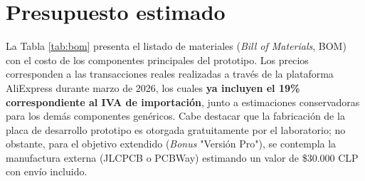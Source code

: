 \documentclass[letterpaper,11pt]{article}
\newcommand{\rtabla}[1]{Tabla \ref{#1}}
\begin{document}
\section{Presupuesto estimado}

La \rtabla{tab:bom} presenta el listado de materiales (\textit{Bill of Materials}, BOM) con el costo de los componentes principales del prototipo. Los precios corresponden a las transacciones reales realizadas a través de la plataforma AliExpress durante marzo de 2026, los cuales \textbf{ya incluyen el 19\% correspondiente al IVA de importación}, junto a estimaciones conservadoras para los demás componentes genéricos. Cabe destacar que la fabricación de la placa de desarrollo prototipo es otorgada gratuitamente por el laboratorio; no obstante, para el objetivo extendido (\textit{Bonus} "Versión Pro"), se contempla la manufactura externa (JLCPCB o PCBWay) estimando un valor de \$30.000 CLP con envío incluido.
\end{document}
